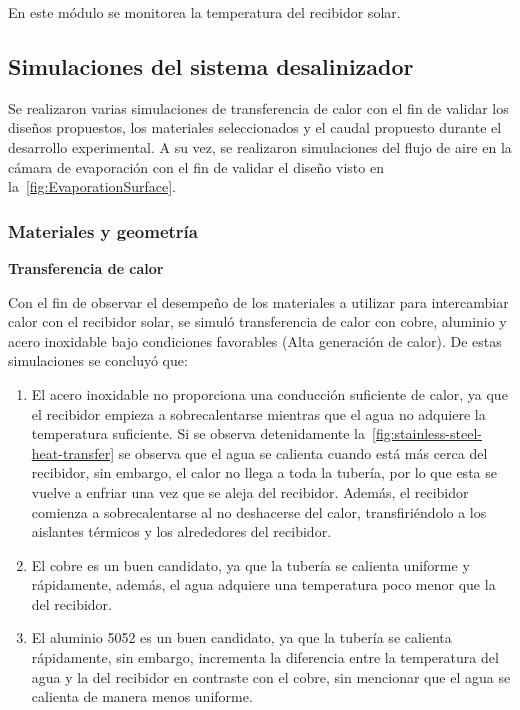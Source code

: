 				\begin{center}
					En este módulo se monitorea la temperatura del recibidor solar.
				\end{center}
		
		\subsection{Simulaciones del sistema desalinizador}
			
			Se realizaron varias simulaciones de transferencia de calor con el fin de validar los diseños propuestos, los materiales seleccionados y el caudal propuesto durante el desarrollo experimental. A su vez, se realizaron simulaciones del flujo de aire en la cámara de evaporación con el fin de validar el diseño visto en la~\cref{fig:EvaporationSurface}.
			
			\subsubsection{Materiales y geometría}
			
				\textbf{Transferencia de calor}\par
			
				Con el fin de observar el desempeño de los materiales a utilizar para intercambiar calor con el recibidor solar, se simuló transferencia de calor con cobre, aluminio y acero inoxidable bajo condiciones favorables (Alta generación de calor). De estas simulaciones se concluyó que:
				
				\begin{enumerate}
					\item El acero inoxidable no proporciona una conducción suficiente de calor, ya que el recibidor empieza a sobrecalentarse mientras que el agua no adquiere la temperatura suficiente. Si se observa detenidamente la~\cref{fig:stainless-steel-heat-transfer} se observa que el agua se calienta cuando está más cerca del recibidor, sin embargo, el calor no llega a toda la tubería, por lo que esta se vuelve a enfriar una vez que se aleja del recibidor. Además, el recibidor comienza a sobrecalentarse al no deshacerse del calor, transfiriéndolo a los aislantes térmicos y los alrededores del recibidor. 
					\item El cobre es un buen candidato, ya que la tubería se calienta uniforme y rápidamente, además, el agua adquiere una temperatura poco menor que la del recibidor.
					
					\item El aluminio 5052 es un buen candidato, ya que la tubería se calienta rápidamente, sin embargo, incrementa la diferencia entre la temperatura del agua y la del recibidor en contraste con el cobre, sin mencionar que el agua se calienta de manera menos uniforme.
				\end{enumerate}
				
